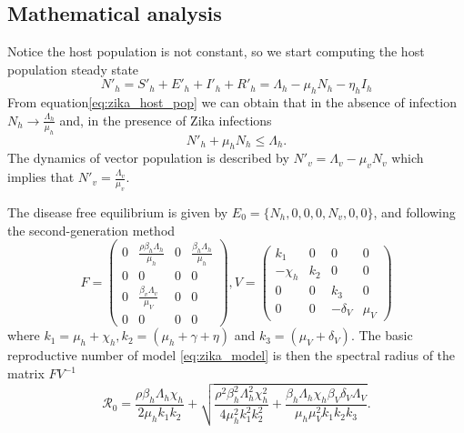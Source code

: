 \documentclass{book}\usepackage[]{graphicx}\usepackage[]{color}
\begin{document}


\subsection*{Mathematical analysis}
Notice the host population is not constant, so we start computing the host population steady state
\begin{equation} \label{eq:zika_host_pop}
    N'_h=S'_h+E'_h+I'_h+R'_h=\Lambda_h-\mu_h N_h-\eta_h I_h
\end{equation}
From equation\eqref{eq:zika_host_pop} we can obtain that in the absence of infection $N_h\rightarrow \frac{\Lambda_h}{\mu_h}$ and, in the presence of Zika infections
$$
N'_{h}+\mu_{h} N_{h} \leq \Lambda_{h}.
$$
The dynamics of vector population is described by $N'_{v}=\Lambda_{v}-\mu_{v} N_{v}$ which implies that $N'_{v}=\frac{\Lambda_v}{\mu_v}$.

The disease free equilibrium is given by $E_0=\{N_h,0,0,0,N_v,0,0\}$, and following the second-generation method
$$
F=\left(\begin{array}{cccc}
0 & \frac{\rho \beta_{h} \Lambda_{h}}{\mu_{h}} & 0 & \frac{\beta_{h} \Lambda_{h}}{\mu_{h}} \\
0 & 0 & 0 & 0 \\
0 & \frac{\beta_{v} \Lambda_{v}}{\mu_{V}} & 0 & 0 \\
0 & 0 & 0 & 0
\end{array}\right), V=\left(\begin{array}{cccc}
k_{1} & 0 & 0 & 0 \\
-\chi_{h} & k_{2} & 0 & 0 \\
0 & 0 & k_{3} & 0 \\
0 & 0 & -\delta_{V} & \mu_{V}
\end{array}\right)
$$
where $k_{1}=\mu_{h}+\chi_{h}, k_{2}=\left(\mu_{h}+\gamma+\eta\right)$ and $k_{3}=\left(\mu_{V}+\delta_{V}\right)$. The basic reproductive number of model \eqref{eq:zika_model} is  then the spectral radius of the matrix $FV^{-1}$
$$\mathcal{R}_{0}=\frac{\rho \beta_{h} \Lambda_{h} \chi_{h}}{2 \mu_{h} k_{1} k_{2}}+\sqrt{\frac{\rho^{2} \beta_{h}^{2} \Lambda_{h}^{2} \chi_{h}^{2}}{4 \mu_{h}^{2} k_{1}^{2} k_{2}^{2}}+\frac{\beta_{h} \Lambda_{h} \chi_{h} \beta_{V} \delta_{V} \Lambda_{V}}{\mu_{h} \mu_{V}^{2} k_{1} k_{2} k_{3}}}.$$
\end{document}
